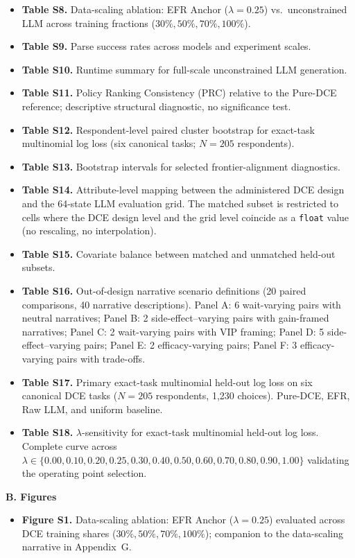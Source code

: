 \documentclass[12pt]{article}
\begin{document}
\begin{itemize}
\item \textbf{Table S8.} Data-scaling ablation: EFR Anchor ($\lambda=0.25$) vs.\ unconstrained LLM across training fractions ($30\%, 50\%, 70\%, 100\%$).
\item \textbf{Table S9.} Parse success rates across models and experiment scales.
\item \textbf{Table S10.} Runtime summary for full-scale unconstrained LLM generation.
\item \textbf{Table S11.} Policy Ranking Consistency (PRC) relative to the Pure-DCE reference; descriptive structural diagnostic, no significance test.
\item \textbf{Table S12.} Respondent-level paired cluster bootstrap for exact-task multinomial log loss (six canonical tasks; $N = 205$ respondents).
\item \textbf{Table S13.} Bootstrap intervals for selected frontier-alignment diagnostics.
\item \textbf{Table S14.} Attribute-level mapping between the administered DCE design and the 64-state LLM evaluation grid. The matched subset is restricted to cells where the DCE design level and the grid level coincide as a \texttt{float} value (no rescaling, no interpolation).
\item \textbf{Table S15.} Covariate balance between matched and unmatched held-out subsets.
\item \textbf{Table S16.} Out-of-design narrative scenario definitions (20 paired comparisons, 40 narrative descriptions). Panel A: 6 wait-varying pairs with neutral narratives; Panel B: 2 side-effect--varying pairs with gain-framed narratives; Panel C: 2 wait-varying pairs with VIP framing; Panel D: 5 side-effect--varying pairs; Panel E: 2 efficacy-varying pairs; Panel F: 3 efficacy-varying pairs with trade-offs.
\item \textbf{Table S17.} Primary exact-task multinomial held-out log loss on six canonical DCE tasks ($N = 205$ respondents, 1,230 choices). Pure-DCE, EFR, Raw LLM, and uniform baseline.
\item \textbf{Table S18.} $\lambda$-sensitivity for exact-task multinomial held-out log loss. Complete curve across $\lambda \in \{0.00, 0.10, 0.20, 0.25, 0.30, 0.40, 0.50, 0.60, 0.70, 0.80, 0.90, 1.00\}$ validating the operating point selection.
\end{itemize}

\textbf{B. Figures}
\begin{itemize}\setlength{\itemsep}{0pt}
\item \textbf{Figure S1.} Data-scaling ablation: EFR Anchor ($\lambda = 0.25$) evaluated across DCE training shares ($30\%, 50\%, 70\%, 100\%$); companion to the data-scaling narrative in Appendix~G.
\end{itemize}
\end{document}
